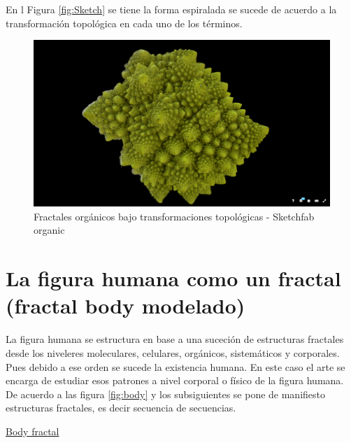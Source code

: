 \documentclass[
  11pt,
]{krantz}
\theoremstyle{definition}
\theoremstyle{definition}
\theoremstyle{definition}
\theoremstyle{definition}
\theoremstyle{remark}
\begin{document}
En l Figura \ref{fig:Sketch} se tiene la forma espiralada se sucede de acuerdo a la transformación topológica en cada uno de los términos.

\begin{figure}[!ht]

{\centering \includegraphics[width=1\linewidth]{Sketch2} 

}

\caption{Fractales orgánicos bajo transformaciones topológicas - Sketchfab organic}\label{fig:Sketch2}
\end{figure}

\hypertarget{la-figura-humana-como-un-fractal-fractal-body-modelado}{%
\section{La figura humana como un fractal (fractal body modelado)}\label{la-figura-humana-como-un-fractal-fractal-body-modelado}}

La figura humana se estructura en base a una suceción de estructuras fractales desde los niveleres moleculares, celulares, orgánicos, sistemáticos y corporales. Pues debido a ese orden se sucede la existencia humana. En este caso el arte se encarga de estudiar esos patrones a nivel corporal o físico de la figura humana. De acuerdo a las figura \ref{fig:body} y los subsiguientes se pone de manifiesto estructuras fractales, es decir secuencia de secuencias.

\href{https://www.behance.net/gallery/11339339/FRACTAL-BODY}{Body fractal}
\end{document}
